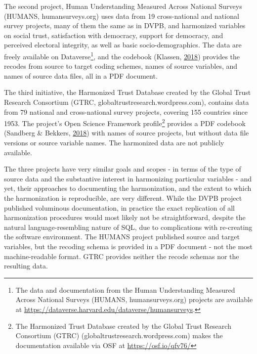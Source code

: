 \documentclass[12pt,]{article}
\let\rmarkdownfootnote\footnote%
\def\footnote{\protect\rmarkdownfootnote}
\begin{document}
The second project, Human Understanding Measured Across National Surveys (HUMANS, humansurveys.org) uses data from 19 cross-national and national survey projects, many of them the same as in DVPB, and harmonized variables on social trust, satisfaction with democracy, support for democracy, and perceived electoral integrity, as well as basic socio-demographics. The data are freely available on Dataverse\footnote{The data and documentation from the Human Understanding Measured Across National Surveys (HUMANS, humansurveys.org) projects are available at \url{https://dataverse.harvard.edu/dataverse/humansurveys}.}, and the codebook (Klassen, \protect\hyperlink{ref-Klassen2018}{2018}) provides the recodes from source to target coding schemes, names of source variables, and names of source data files, all in a PDF document.

The third initiative, the Harmonized Trust Database created by the Global Trust Research Consortium (GTRC, globaltrustresearch.wordpress.com), contains data from 79 national and cross-national survey projects, covering 155 countries since 1953. The project's Open Science Framework profile\footnote{The Harmonized Trust Database created by the Global Trust Research Consortium (GTRC) (globaltrustresearch.wordpress.com) makes the documentation available via OSF at \url{https://osf.io/qfv76/}} provides a PDF codebook (Sandberg \& Bekkers, \protect\hyperlink{ref-Sandberg2018}{2018}) with names of source projects, but without data file versions or source variable names. The harmonized data are not publicly available.

The three projects have very similar goals and scopes - in terms of the type of source data and the substantive interest in harmonizing particular variables - and yet, their approaches to documenting the harmonization, and the extent to which the harmonization is reproducible, are very different. While the DVPB project published voluminous documentation, in practice the exact replication of all harmonization procedures would most likely not be straightforward, despite the natural language-resembling nature of SQL, due to complications with re-creating the software environment. The HUMANS project published source and target variables, but the recoding schema is provided in a PDF document - not the most machine-readable format. GTRC provides neither the recode schemas nor the resulting data.
\end{document}
